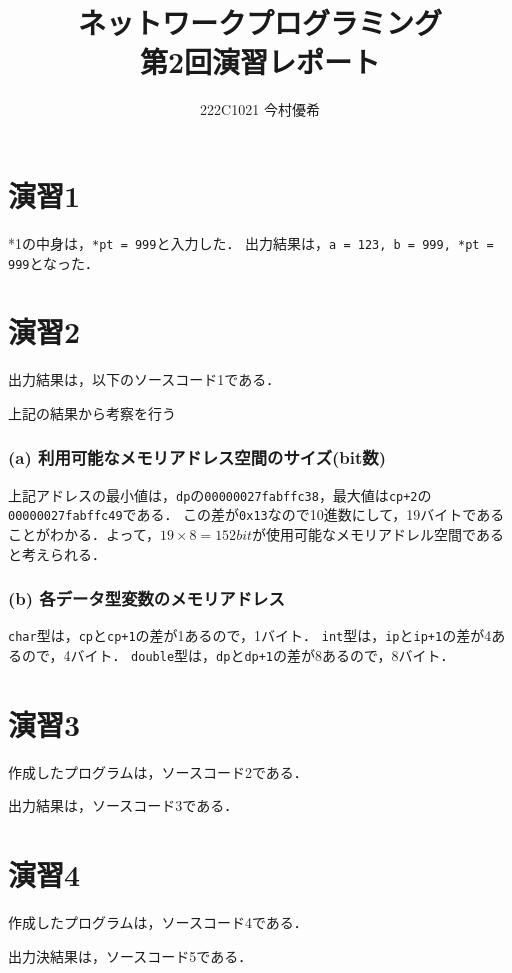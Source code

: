 \documentclass[documentclass]{jsarticle}
\begin{document}
\title{ネットワークプログラミング\\ 第2回演習レポート}
\author{222C1021 今村優希}
\maketitle

\newpage

\section*{演習1}
*1の中身は，\texttt{*pt = 999}と入力した．
出力結果は，\texttt{a = 123, b = 999, *pt = 999}となった．

\section*{演習2}
出力結果は，以下のソースコード1である．

上記の結果から考察を行う

\subsubsection*{(a) 利用可能なメモリアドレス空間のサイズ(bit数)}
上記アドレスの最小値は，\texttt{dp}の\texttt{00000027fabffc38}，最大値は\texttt{cp+2}の\texttt{00000027fabffc49}である．
この差が\texttt{0x13}なので10進数にして，19バイトであることがわかる．よって，$19 \times 8 = 152bit$が使用可能なメモリアドレル空間であると考えられる．

\subsubsection*{(b) 各データ型変数のメモリアドレス}
\texttt{char}型は，\texttt{cp}と\texttt{cp+1}の差が1あるので，1バイト．
\texttt{int}型は，\texttt{ip}と\texttt{ip+1}の差が4あるので，4バイト．
\texttt{double}型は，\texttt{dp}と\texttt{dp+1}の差が8あるので，8バイト．

\section*{演習3}
作成したプログラムは，ソースコード2である．

出力結果は，ソースコード3である．


\section*{演習4}
作成したプログラムは，ソースコード4である．

出力決結果は，ソースコード5である．


\end{document}
